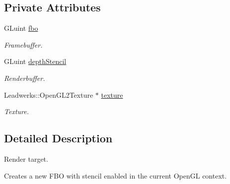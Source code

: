 \subsection*{Private Attributes}
\begin{DoxyCompactItemize}
\item 
\hypertarget{class_u_i_render_target_a71089abfab0c5ef2e04fc81bbc986ebf}{G\-Luint \hyperlink{class_u_i_render_target_a71089abfab0c5ef2e04fc81bbc986ebf}{fbo}}\label{class_u_i_render_target_a71089abfab0c5ef2e04fc81bbc986ebf}

\begin{DoxyCompactList}\small\item\em Framebuffer. \end{DoxyCompactList}\item 
\hypertarget{class_u_i_render_target_a59c466d2b55a013e36dbff39dda3a38f}{G\-Luint \hyperlink{class_u_i_render_target_a59c466d2b55a013e36dbff39dda3a38f}{depth\-Stencil}}\label{class_u_i_render_target_a59c466d2b55a013e36dbff39dda3a38f}

\begin{DoxyCompactList}\small\item\em Renderbuffer. \end{DoxyCompactList}\item 
\hypertarget{class_u_i_render_target_ae865daebacafba6e779ab2dec1c04690}{Leadwerks\-::\-Open\-G\-L2\-Texture $\ast$ \hyperlink{class_u_i_render_target_ae865daebacafba6e779ab2dec1c04690}{texture}}\label{class_u_i_render_target_ae865daebacafba6e779ab2dec1c04690}

\begin{DoxyCompactList}\small\item\em Texture. \end{DoxyCompactList}\end{DoxyCompactItemize}


\subsection{Detailed Description}
Render target. 

Creates a new F\-B\-O with stencil enabled in the current Open\-G\-L context. 


